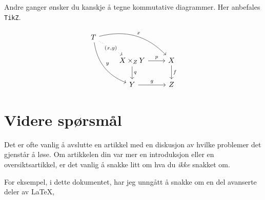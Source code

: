 \documentclass[11pt, english, a4paper]{article}
\begin{document}
Andre ganger ønsker du kanskje å tegne kommutative diagrammer. Her anbefales \texttt{TikZ}. 

\[
\begin{tikzcd}
T
\arrow[drr, bend left, "x"]
\arrow[ddr, bend right, "y"]
\arrow[dr, dotted, "{(x,y)}" description] & & \\
& X \times_Z Y \arrow[r, "p"] \arrow[d, "q"]
& X \arrow[d, "f"] \\
& Y \arrow[r, "g"]
& Z
\end{tikzcd}
\]



\section{Videre spørsmål}

Det er ofte vanlig å avslutte en artikkel med en diskusjon av hvilke problemer det gjenstår å løse. Om artikkelen din var mer en introduksjon eller en oversiktsartikkel, er det vanlig å snakke litt om hva du \emph{ikke} snakket om.

For eksempel, i dette dokumentet, har jeg unngått å snakke om en del avanserte deler av \LaTeX, 
\end{document}
